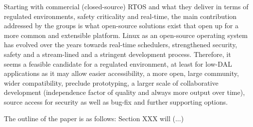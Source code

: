 Starting with commercial (closed-source) RTOS and what they deliver in terms of regulated environments, safety criticality and real-time, the main contribution addressed by the groups is what open-source solutions exist that open up for a more common and extensible platform. Linux as an open-source operating system has evolved over the years towards real-time schedulers, strengthened security, safety and a stream-lined and a stringent development process. Therefore, it seems a feasible candidate for a regulated environment, at least for low-DAL applications as it may allow easier accessibility, a more open, large community, wider compatibility, preclude prototyping, a larger scale of collaborative development (independence factor of quality and always more output over time), source access for security as well as bug-fix and further supporting options.

The outline of the paper is as follows: Section XXX will (...)




